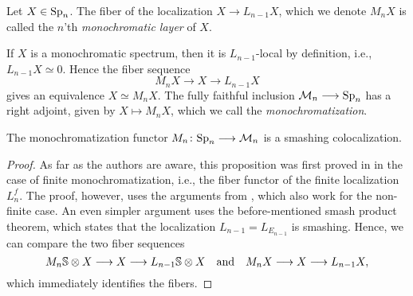 \begin{definition}
    Let $X\in \sp\np$. The fiber of the localization $X\longrightarrow L_{n-1}X$, which we denote $M_n X$ is called the $n$'th \emph{monochromatic layer} of $X$. 
\end{definition}

\begin{remark}
    If $X$ is a monochromatic spectrum, then it is $L_{n-1}$-local by definition, i.e., $L_{n-1}X\simeq 0$. Hence the fiber sequence 
    \[M_n X\longrightarrow X\longrightarrow L_{n-1}X\]
    gives an equivalence $X\simeq M_n X$. The fully faithful inclusion $\M\np\longrightarrow \sp\np$ has a right adjoint, given by $X\longmapsto M_nX$, which we call the \emph{monochromatization}. 
\end{remark}

\begin{proposition}
    \label{ch0:prop:monochromatization-is-smashing}
    The monochromatization functor $M_n\colon \sp\np\longrightarrow \M\np$ is a smashing colocalization. 
\end{proposition}
\begin{proof}
    As far as the authors are aware, this proposition was first proved in \cite[Sec 6.3]{bousfield_1996} in the case of finite monochromatization, i.e., the fiber functor of the finite localization $L_n^f$. The proof, however, uses the arguments from \cite[2.10]{bousfield_1979_bool}, which also work for the non-finite case. An even simpler argument uses the before-mentioned smash product theorem, which states that the localization $L_{n-1} = L_{E_{n-1}}$ is smashing. Hence, we can compare the two fiber sequences
    \[M_n \S \otimes X \longrightarrow X \longrightarrow L_{n-1}\S\otimes X \quad \text{and}\quad M_n X\longrightarrow X\longrightarrow L_{n-1} X,\]
    which immediately identifies the fibers.  
\end{proof}



